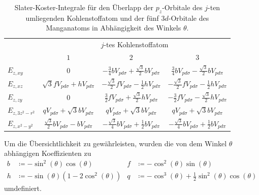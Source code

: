 \begin{table}
    \centering
    \caption{Slater-Koster-Integrale für den Überlapp der $p_z$-Orbitale des $j$-ten umliegenden
    Kohlenstoffatom und der fünf $3d$-Orbitale des Manganatoms in Abhängigkeit des Winkels $\theta$.}
    \label{tab:slaterkosters}
    \begin{tabular}{l c c c}
    & \multicolumn{3}{c}{$j$-tes Kohlenstoffatom}\\
    \cmidrule(lr){2-4}
    & {$1$} & {$2$} & {$3$} \\
    \midrule
    {$E_{z,xy}$      }  & {$0$}                                               & {$-\frac{3}{4}bV_{pd\sigma} + \frac{\sqrt{3}}{2}bV_{pd\pi}$}          & {$ \frac{3}{4}bV_{pd\sigma}-\frac{\sqrt{3}}{2}bV_{pd\pi}$}         \vspace{0.5cm} \\ 
    {$E_{z,xz}$      }  & {$\sqrt{3}fV_{pd\sigma} + hV_{pd\pi}$}              & {$-\frac{\sqrt{3}}{2}fV_{pd\sigma} - \frac{1}{2} hV_{pd\pi}$}         & {$-\frac{\sqrt{3}}{2}fV_{pd\sigma} - \frac{1}{2} hV_{pd\pi}$}      \vspace{0.5cm} \\
    {$E_{z,zy}$      }  & {$0$}                                               & {$ \frac{3}{2}fV_{pd\sigma}+\frac{\sqrt{3}}{2} hV_{pd\pi}$}           & {$-\frac{3}{2}fV_{pd\sigma}-\frac{\sqrt{3}}{2} hV_{pd\pi}$}        \vspace{0.5cm} \\
    {$E_{z,3z^2-r^2}$}  & {$q V_{pd\sigma}+\sqrt{3}bV_{pd\pi}$}               & {$q V_{pd\sigma}+\sqrt{3}bV_{pd\pi}$}                                 & {$q V_{pd\sigma}+\sqrt{3}bV_{pd\pi}$} \vspace{0.5cm} \\
    {$E_{z,x^2-y^2}$ }  & {$\frac{\sqrt{3}}{2}bV_{pd\sigma}-bV_{pd\pi}$}      & {$-\frac{\sqrt{3}}{4}bV_{pd\sigma}+\frac{1}{2}bV_{pd\pi}$}           & {$-\frac{\sqrt{3}}{4}bV_{pd\sigma}+\frac{1}{2}bV_{pd\pi}$}                       \\ 
    \bottomrule
    \end{tabular}
  \end{table}
Um die Übersichtlichkeit zu gewährleisten, wurden die von dem Winkel $\theta$ abhängigen Koeffizienten zu
\begin{equation}
    \begin{aligned}
b & \coloneq -\sin^2(\theta) \cos(\theta)        & f &  \coloneq -\cos^2(\theta) \sin(\theta)                             \\                     
h & \coloneq -\sin(\theta)(1-2\cos^2(\theta))    & q &  \coloneq -\cos^3(\theta) + \frac{1}{2}\sin^2(\theta) \cos(\theta)
    \end{aligned} \label{eqn:Vorfaktoren}
\end{equation}
umdefiniert.

